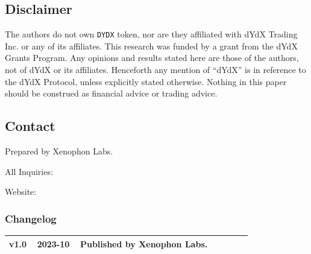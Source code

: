 \documentclass[
        a4paper, %
	8pt, %
]{CSSullivanBusinessReport}
\begin{document}
\begin{twothirdswidth}
    
    \small

    \subsection*{Disclaimer}

	The authors do not own \texttt{DYDX} token, nor are they affiliated with dYdX Trading Inc. or any of its affiliates. This research was funded by a grant from the dYdX Grants Program. Any opinions and results stated here are those of the authors, not of dYdX or its affiliates. Henceforth any mention of ``dYdX'' is in reference to the dYdX Protocol, unless explicitly stated otherwise. Nothing in this paper should be construed as financial advice or trading advice.
	
	
	
	
	\subsection*{Contact}
	
        Prepared by Xenophon Labs.

        All Inquiries: 
        
        Website: 
	
	\vfill %
	
	\subsubsection*{Changelog}
	
	\scriptsize %
	
	\begin{tabular}{@{} L{0.05\linewidth} L{0.15\linewidth} L{0.6\linewidth} @{}} %
		\toprule
		v1.0 & 2023-10 & Published by Xenophon Labs.\\
		\bottomrule
	\end{tabular}
\end{twothirdswidth}
\end{document}
